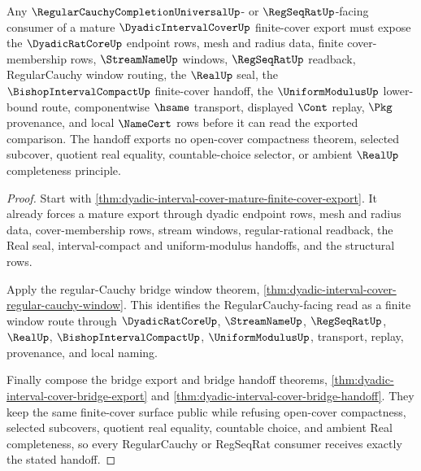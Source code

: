 \begin{theorem}
\label{thm:dyadic-interval-cover-regular-cauchy-finite-window-handoff}
Any $\RegularCauchyCompletionUniversalUp$- or $\RegSeqRatUp$-facing consumer of a mature $\DyadicIntervalCoverUp$ finite-cover export must expose the $\DyadicRatCoreUp$ endpoint rows, mesh and radius data, finite cover-membership rows, $\StreamNameUp$ windows, $\RegSeqRatUp$ readback, RegularCauchy window routing, the $\RealUp$ seal, the $\BishopIntervalCompactUp$ finite-cover handoff, the $\UniformModulusUp$ lower-bound route, componentwise $\hsame$ transport, displayed $\Cont$ replay, $\Pkg$ provenance, and local $\NameCert$ rows before it can read the exported comparison. The handoff exports no open-cover compactness theorem, selected subcover, quotient real equality, countable-choice selector, or ambient $\RealUp$ completeness principle.
\end{theorem}
\begin{proof}
Start with \autoref{thm:dyadic-interval-cover-mature-finite-cover-export}. It already forces a mature export through dyadic endpoint rows, mesh and radius data, cover-membership rows, stream windows, regular-rational readback, the Real seal, interval-compact and uniform-modulus handoffs, and the structural rows.

Apply the regular-Cauchy bridge window theorem, \autoref{thm:dyadic-interval-cover-regular-cauchy-window}. This identifies the RegularCauchy-facing read as a finite window route through $\DyadicRatCoreUp$, $\StreamNameUp$, $\RegSeqRatUp$, $\RealUp$, $\BishopIntervalCompactUp$, $\UniformModulusUp$, transport, replay, provenance, and local naming.

Finally compose the bridge export and bridge handoff theorems, \autoref{thm:dyadic-interval-cover-bridge-export} and \autoref{thm:dyadic-interval-cover-bridge-handoff}. They keep the same finite-cover surface public while refusing open-cover compactness, selected subcovers, quotient real equality, countable choice, and ambient Real completeness, so every RegularCauchy or RegSeqRat consumer receives exactly the stated handoff.
\end{proof}
